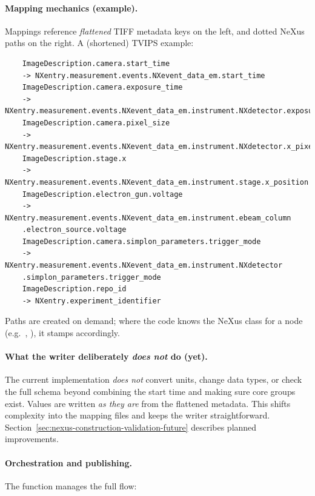 \paragraph{Mapping mechanics (example).}
Mappings reference \emph{flattened} TIFF metadata keys on the left, and dotted NeXus paths on the right. A (shortened) TVIPS example:
\begin{verbatim}
	ImageDescription.camera.start_time
	-> NXentry.measurement.events.NXevent_data_em.start_time
	ImageDescription.camera.exposure_time
	-> NXentry.measurement.events.NXevent_data_em.instrument.NXdetector.exposure_time
	ImageDescription.camera.pixel_size
	-> NXentry.measurement.events.NXevent_data_em.instrument.NXdetector.x_pixel_size
	ImageDescription.stage.x
	-> NXentry.measurement.events.NXevent_data_em.instrument.stage.x_position
	ImageDescription.electron_gun.voltage
	-> NXentry.measurement.events.NXevent_data_em.instrument.ebeam_column
	.electron_source.voltage
	ImageDescription.camera.simplon_parameters.trigger_mode
	-> NXentry.measurement.events.NXevent_data_em.instrument.NXdetector
	.simplon_parameters.trigger_mode
	ImageDescription.repo_id
	-> NXentry.experiment_identifier
\end{verbatim}
\noindent Paths are created on demand; where the code knows the NeXus class for a node (e.g.\ , ), it stamps  accordingly.

\paragraph{What the writer deliberately \emph{does not} do (yet).}
The current implementation \emph{does not} convert units, change data types, or check the full schema beyond combining the start time and making sure core groups exist. Values are written \emph{as they are} from the flattened metadata. This shifts complexity into the mapping files and keeps the writer straightforward. Section~\ref{sec:nexus-construction-validation-future} describes planned improvements.

\paragraph{Orchestration and publishing.}
The function  manages the full flow:

